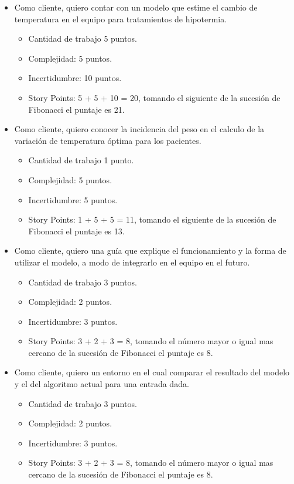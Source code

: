 \documentclass[
11pt, %
]{charter}
\begin{document}
\begin{itemize}
	\item Como cliente, quiero contar con un modelo que estime el cambio de temperatura en el equipo para tratamientos de hipotermia.
		\begin{itemize}
			\item Cantidad de trabajo 5 puntos.
			\item Complejidad: 5 puntos.
			\item Incertidumbre: 10 puntos.
			\item Story Points: 5 + 5 + 10 = 20, tomando el siguiente de la sucesión de Fibonacci el puntaje es 21.
		\end{itemize}
	\item Como cliente, quiero conocer la incidencia del peso en el calculo de la variación de temperatura óptima para los pacientes.
		\begin{itemize}
			\item Cantidad de trabajo 1 punto.
			\item Complejidad: 5 puntos.
			\item Incertidumbre: 5 puntos.
			\item Story Points: 1 + 5 + 5 = 11, tomando el siguiente de la sucesión de Fibonacci el puntaje es 13.
		\end{itemize}
	\item Como cliente, quiero una guía que explique el funcionamiento y la forma de utilizar el modelo, a modo de integrarlo en el equipo en el futuro.
		\begin{itemize}
			\item Cantidad de trabajo 3 puntos.
			\item Complejidad: 2 puntos.
			\item Incertidumbre: 3 puntos.
			\item Story Points: 3 + 2 + 3 = 8, tomando el número mayor o igual mas cercano de la sucesión de Fibonacci el puntaje es 8.
		\end{itemize}
	\item Como cliente, quiero un entorno en el cual comparar el resultado del modelo y el del algoritmo actual para una entrada dada.
	\begin{itemize}
		\item Cantidad de trabajo 3 puntos.
		\item Complejidad: 2 puntos.
		\item Incertidumbre: 3 puntos.
		\item Story Points: 3 + 2 + 3 = 8, tomando el número mayor o igual mas cercano de la sucesión de Fibonacci el puntaje es 8.
	\end{itemize}
\end{itemize}
\end{document}
